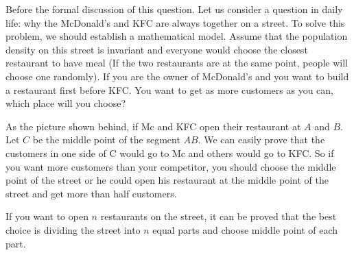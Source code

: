 Before the formal discussion of this question. Let us consider a 
question in daily life: why the McDonald's and KFC are always together
on a street. To solve this problem, we should establish a mathematical
model. Assume that the population density on this street is invariant
and everyone would choose the closest restaurant to have meal (If the
two restaurants are at the same point, people will choose one
randomly). If you are the owner of McDonald's and you want to build
a restaurant first before KFC. You want to get as more customers
as you can, which place will you choose?
	
As the picture shown behind, if Mc and KFC open their restaurant at $A$
and $B$. Let $C$ be the middle point of the segment $AB$. We can easily
prove that the customers in one side of C would go to Mc and others
would go to KFC. So if you want more customers than your competitor,
you should choose the middle point of the street or he could open his
restaurant at the middle point of the street and get more than half customers.
	
\begin{center}
\end{center}
	
If you want to open $n$ restaurants on the street, it can be proved that
the best choice is dividing the street into $n$ equal parts and choose
middle point of each part.
	
